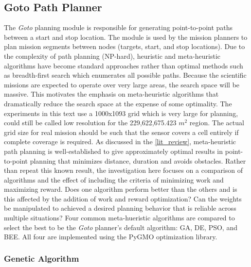 \documentclass{tamuccthesis}
\begin{document}
\subsection{Goto Path Planner}
\label{section:goto}
The \textit{Goto} planning module is responsible for generating point-to-point paths between a start and stop location. The module is used by the mission planners to plan mission segments between nodes (targets, start, and stop locations). Due to the complexity of path planning (NP-hard), heuristic and meta-heuristic algorithms have become standard approaches rather than optimal methods such as breadth-first search which enumerates all possible paths. Because the scientific missions are expected to operate over very large areas, the search space will be massive. This motivates the emphasis on meta-heuristic algorithms that dramatically reduce the search space at the expense of some optimality. The experiments in this text use a 1000x1093 grid which is very large for planning, could still be called low resolution for the 229,622,675.423 $m^2$ region. The actual grid size for real mission should be such that the sensor covers a cell entirely if complete coverage is required. As discussed in the \ref{lit_review}, meta-heuristic path planning is well-established to give approximately optimal results in point-to-point planning that minimizes distance, duration and avoids obstacles. Rather than repeat this known result, the investigation here focuses on a comparison of algorithms and the effect of including the criteria of minimizing work and maximizing reward. Does one algorithm perform better than the others and is this affected by the addition of work and reward optimization? Can the weights be manipulated to achieved a desired planning behavior that is reliable across multiple situations? Four common meta-hueristic algorithms are compared to select the best to be the \textit{Goto} planner's default algorithm: GA, DE, PSO, and BEE. All four are implemented using the PyGMO optimization library. 

\subsubsection{Genetic Algorithm}
\end{document}
